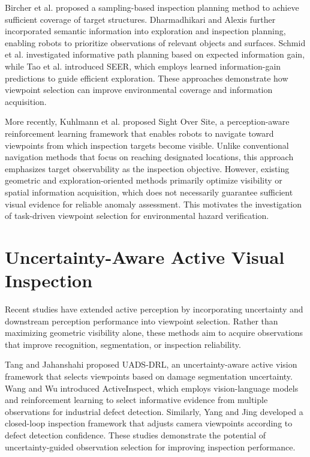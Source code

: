 Bircher et al. \cite{bircher2017inspection} proposed a sampling-based inspection planning method to achieve sufficient coverage of target structures.
Dharmadhikari and Alexis \cite{dharmadhikari2023semantics} further incorporated semantic information into exploration and inspection planning, enabling robots to prioritize observations of relevant objects and surfaces.
Schmid et al. \cite{schmid2020informative} investigated informative path planning based on expected information gain, while Tao et al. \cite{tao2023seer} introduced SEER, which employs learned information-gain predictions to guide efficient exploration.
These approaches demonstrate how viewpoint selection can improve environmental coverage and information acquisition.

More recently, Kuhlmann et al. \cite{kuhlmann2026sight} proposed Sight Over Site, a perception-aware reinforcement learning framework that enables robots to navigate toward viewpoints from which inspection targets become visible.
Unlike conventional navigation methods that focus on reaching designated locations, this approach emphasizes target observability as the inspection objective.
However, existing geometric and exploration-oriented methods primarily optimize visibility or spatial information acquisition, which does not necessarily guarantee sufficient visual evidence for reliable anomaly assessment.
This motivates the investigation of task-driven viewpoint selection for environmental hazard verification.

\section{Uncertainty-Aware Active Visual Inspection}
Recent studies have extended active perception by incorporating uncertainty and downstream perception performance into viewpoint selection.
Rather than maximizing geometric visibility alone, these methods aim to acquire observations that improve recognition, segmentation, or inspection reliability.

Tang and Jahanshahi \cite{tang2025uncertainty} proposed UADS-DRL, an uncertainty-aware active vision framework that selects viewpoints based on damage segmentation uncertainty.
Wang and Wu \cite{wang2026activeinspect} introduced ActiveInspect, which employs vision-language models and reinforcement learning to select informative evidence from multiple observations for industrial defect detection.
Similarly, Yang and Jing \cite{yang2026closedloop} developed a closed-loop inspection framework that adjusts camera viewpoints according to defect detection confidence.
These studies demonstrate the potential of uncertainty-guided observation selection for improving inspection performance.

